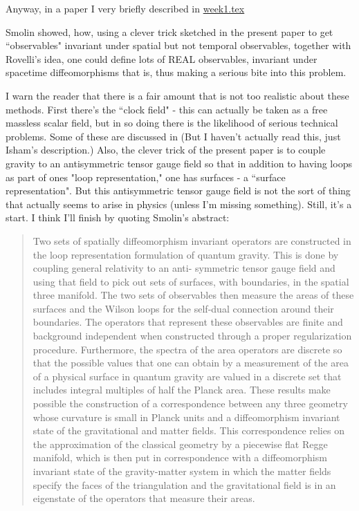 Anyway, in a paper I very briefly described in {\hyperref[week1]{week1.tex}}


Smolin showed, how, using a clever trick sketched in the present paper to get ``observables" invariant under spatial but not temporal observables, together with Rovelli's idea, one could define lots of REAL observables, invariant under spacetime diffeomorphisms that is, thus making a serious bite into this problem.

I warn the reader that there is a fair amount that is not too realistic about these methods. First there's the ``clock field" - this can actually be taken as a free massless scalar field, but in so doing there is the likelihood of serious technical problems. Some of these are discussed in
(But I haven't actually read this, just Isham's description.) Also, the clever trick of the present paper is to couple gravity to an antisymmetric tensor gauge field so that in addition to having loops as part of ones "loop representation," one has surfaces - a ``surface representation". But this antisymmetric tensor gauge field is not the sort of thing that actually seems to arise in physics (unless I'm missing something). Still, it's a start. I think I'll finish by quoting Smolin's abstract:
\begin{quote}
    Two sets of spatially diffeomorphism invariant operators are constructed in the loop representation formulation of quantum gravity. This is done by coupling general relativity to an anti- symmetric tensor gauge field and using that field to pick out sets of surfaces, with boundaries, in the spatial three manifold. The two sets of observables then measure the areas of these surfaces and the Wilson loops for the self-dual connection around their boundaries. The operators that represent these observables are finite and background independent when constructed through a proper regularization procedure. Furthermore, the spectra of the area operators are discrete so that the possible values that one can obtain by a measurement of the area of a physical surface in quantum gravity are valued in a discrete set that includes integral multiples of half the Planck area. These results make possible the construction of a correspondence between any three geometry whose curvature is small in Planck units and a diffeomorphism invariant state of the gravitational and matter fields. This correspondence relies on the approximation of the classical geometry by a piecewise flat Regge manifold, which is then put in correspondence with a diffeomorphism invariant state of the gravity-matter system in which the matter fields specify the faces of the triangulation and the gravitational field is in an eigenstate of the operators that measure their areas.
\end{quote}


